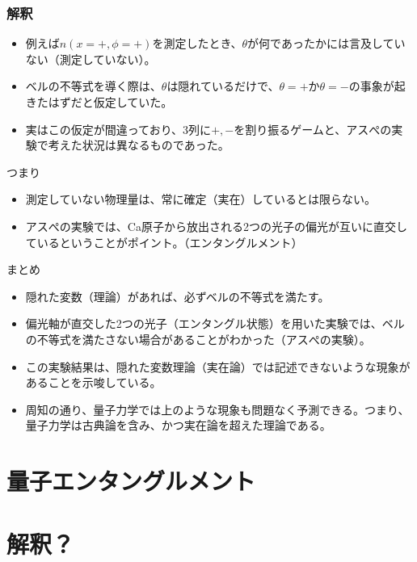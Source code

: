 \documentclass[10pt,b5paper,papersize,dvipdfmx]{jsbook}
\begin{document}
\subsubsection{解釈}

\begin{itemize}
  \item 例えば$n(x=+,\phi=+)$を測定したとき、$\theta$が何であったかには言及していない（測定していない）。
  \item ベルの不等式を導く際は、$\theta$は隠れているだけで、$\theta=+$か$\theta=-$の事象が起きたはずだと仮定していた。
  \item 実はこの仮定が間違っており、3列に$+,-$を割り振るゲームと、アスぺの実験で考えた状況は異なるものであった。
\end{itemize}

つまり

\begin{itemize}
  \item 測定していない物理量は、常に確定（実在）しているとは限らない。
  \item アスぺの実験では、Ca原子から放出される2つの光子の偏光が互いに直交しているということがポイント。（エンタングルメント）
\end{itemize}

まとめ

\begin{itemize}
  \item 隠れた変数（理論）があれば、必ずベルの不等式を満たす。
  \item 偏光軸が直交した2つの光子（エンタングル状態）を用いた実験では、ベルの不等式を満たさない場合があることがわかった（アスぺの実験）。
  \item この実験結果は、隠れた変数理論（実在論）では記述できないような現象があることを示唆している。
  \item 周知の通り、量子力学では上のような現象も問題なく予測できる。つまり、量子力学は古典論を含み、かつ実在論を超えた理論である。
\end{itemize}


\section{量子エンタングルメント}

\section{解釈？}
\end{document}
